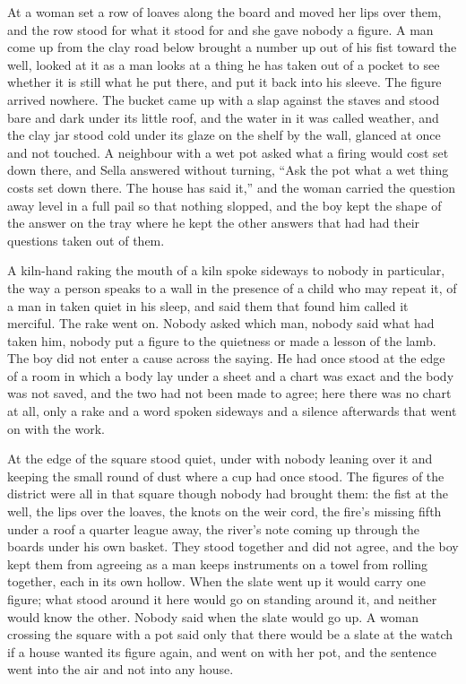 At  a woman set a row of loaves along the board and moved her lips over them, and the row stood for what it stood for and she gave nobody a figure. A man come up from the clay road below brought a number up out of his fist toward the well, looked at it as a man looks at a thing he has taken out of a pocket to see whether it is still what he put there, and put it back into his sleeve. The figure arrived nowhere. The bucket came up with a slap against the staves and  stood bare and dark under its little roof, and the water in it was called weather, and the clay jar stood cold under its glaze on the shelf by the wall, glanced at once and not touched. A neighbour with a wet pot asked what a firing would cost set down there, and Sella answered without turning, “Ask the pot what a wet thing costs set down there. The house has said it,” and the woman carried the question away level in a full pail so that nothing slopped, and the boy kept the shape of the answer on the tray where he kept the other answers that had had their questions taken out of them.

A kiln-hand raking the mouth of a kiln spoke sideways to nobody in particular, the way a person speaks to a wall in the presence of a child who may repeat it, of a man in  taken quiet in his sleep, and said them that found him called it merciful. The rake went on. Nobody asked which man, nobody said what had taken him, nobody put a figure to the quietness or made a lesson of the lamb. The boy did not enter a cause across the saying. He had once stood at the edge of a room in which a body lay under a sheet and a chart was exact and the body was not saved, and the two had not been made to agree; here there was no chart at all, only a rake and a word spoken sideways and a silence afterwards that went on with the work.

\scenebreak

At the edge of  the square stood quiet,  under  with nobody leaning over it and  keeping the small round of dust where a cup had once stood. The figures of the district were all in that square though nobody had brought them: the fist at the well, the lips over the loaves, the knots on the weir cord, the fire's missing fifth under a roof a quarter league away, the river's note coming up through the boards under his own basket. They stood together and did not agree, and the boy kept them from agreeing as a man keeps instruments on a towel from rolling together, each in its own hollow. When the slate went up it would carry one figure; what stood around it here would go on standing around it, and neither would know the other. Nobody said when the slate would go up. A woman crossing the square with a pot said only that there would be a slate at the watch if a house wanted its figure again, and went on with her pot, and the sentence went into the air and not into any house.

